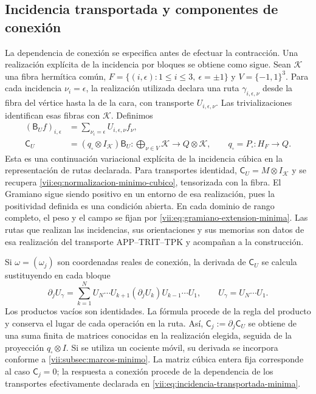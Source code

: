 \subsection{Incidencia transportada y componentes de conexión}
\label{vii:subsec:incidencia-conexion-minima}

La dependencia de conexión se especifica antes de efectuar la
contracción. Una realización explícita de la incidencia por bloques
se obtiene como sigue. Sean \(\mathcal K\) una fibra hermítica común,
\(F=\{(i,\epsilon):1\leq i\leq3,\ \epsilon=\pm1\}\) y
\(V=\{-1,1\}^3\). Para cada incidencia \(\nu_i=\epsilon\),
la realización utilizada declara una ruta \(\gamma_{i,\epsilon,\nu}\)
desde la fibra del vértice hasta la de la cara, con transporte
\(U_{i,\epsilon,\nu}\). Las trivializaciones identifican esas fibras
con \(\mathcal K\). Definimos
\begin{equation}
 \begin{split}
 (\mathsf B_Uf)_{i,\epsilon}
   &=\sum_{\nu_i=\epsilon}U_{i,\epsilon,\nu}f_\nu,\\
 \mathsf C_U&=(q_\square\otimes I_{\mathcal K})\mathsf B_U:
   \bigoplus_{\nu\in V}\mathcal K\longrightarrow Q\otimes\mathcal K,
 \qquad q_\square=P_\square:H_F\to Q.
 \end{split}
 \label{vii:eq:incidencia-transportada-minima}
\end{equation}
Esta es una continuación variacional explícita de la incidencia cúbica
en la representación de rutas declarada. Para transportes identidad,
\(\mathsf C_U=M\otimes I_{\mathcal K}\) y se recupera
\eqref{vii:eq:normalizacion-minimo-cubico}, tensorizada con la fibra.
El Gramiano sigue siendo positivo en un entorno de esa realización,
pues la positividad definida es una condición abierta. En cada dominio
de rango completo, el peso y el campo se fijan por
\eqref{vii:eq:gramiano-extension-minima}. Las rutas que realizan las
incidencias, sus orientaciones y sus memorias son datos de esa
realización del transporte APP--TRIT--TPK y acompañan a la construcción.

Si \(\omega=(\omega_j)\) son coordenadas reales de conexión,
la derivada de \(\mathsf C_U\) se calcula sustituyendo en cada bloque
\begin{equation}
 \partial_j U_\gamma
 =\sum_{k=1}^{N}
    U_N\cdots U_{k+1}(\partial_jU_k)U_{k-1}\cdots U_1,
 \qquad U_\gamma=U_N\cdots U_1.
 \label{vii:eq:derivada-incidencia-rutas}
\end{equation}
Los productos vacíos son identidades. La fórmula procede de la regla
del producto y conserva el lugar de cada operación en la ruta.
Así, \(\mathsf C_j:=\partial_j\mathsf C_U\) se obtiene de una
suma finita de matrices conocidas en la realización elegida, seguida
de la proyección \(q_\square\otimes I\). Si se utiliza un cociente
móvil, su derivada se incorpora conforme a
\ref{vii:subsec:marcos-minimo}. La matriz cúbica entera fija corresponde
al caso \(\mathsf C_j=0\); la respuesta a conexión procede de la
dependencia de los transportes efectivamente declarada en
\eqref{vii:eq:incidencia-transportada-minima}.

